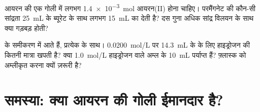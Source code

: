 \begin{exercise}[$\star\star\star$]\label{exo:g11:titration:14}
आयरन की एक गोली में लगभग \qty{1.4e-3}{mol} आयरन(II) होना चाहिए।
परमैंगनेट की कौन-सी सांद्रता \qty{25}{mL} के ब्यूरेट के साथ लगभग
\qty{15}{mL} का  देती है? दस गुना अधिक सांद्र
विलयन के साथ क्या गड़बड़ होती?
\end{exercise}

\begin{exercise}[$\star\star\star$]\label{exo:g11:titration:15}
 के समीकरण में  आते हैं, प्रत्येक  के साथ।
\qty{0.0200}{mol/L} पर \qty{14.3}{mL} के  के लिए
हाइड्रोजन  की कितनी मात्रा खपती है? क्या
\qty{1.0}{mol/L} हाइड्रोजन  वाले अम्ल के \qty{10}{mL} पर्याप्त हैं? फ़्लास्क को
अम्लीकृत करना क्यों ज़रूरी है?
\end{exercise}

\section{समस्या: क्या आयरन की गोली ईमानदार है?}

